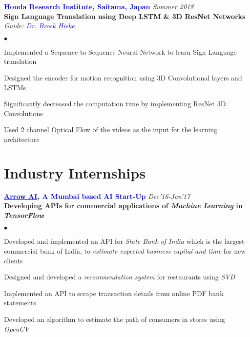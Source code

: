 \documentclass[margin,line, 9pt]{res}
\newenvironment{list2}{
  \begin{list}{$\bullet$}{%
      \setlength{\itemsep}{0.03in}
      \setlength{\parsep}{0in} \setlength{\parskip}{0in}
      \setlength{\topsep}{0in} \setlength{\partopsep}{0in} 
      \setlength{\leftmargin}{0.2in}}}{\end{list}}
\begin{document}
\begin{resume}
{\bf  \href{http://www.jp.honda-ri.com/en/}{\textcolor{blue}{Honda Research Institute, Saitama, Japan}} } \hfill {\it Summer 2018} \\
\textbf{Sign Language Translation using Deep LSTM \& 3D ResNet Networks} \\
{\em Guide: \href{https://www.researchgate.net/profile/Heike_Brock}{\textcolor{blue}{Dr. Brock Hieke}}}  \\
\vspace*{-.13in}
\begin{list2}
\item Implemented a Sequence to Sequence Neural Network to learn Sign Language translation 
\item Designed the encoder for motion recognition using 3D Convolutional layers and LSTMs
\item Significantly decreased the computation time by implementing ResNet 3D Convolutions
\item Used 2 channel Optical Flow of the videos as the input for the learning architecture
\end{list2}

\section{\sc Industry Internships}
{\bf \href{http://arrowai.com}{\textcolor{blue} {Arrow AI}}, {\textcolor{blue}{A Mumbai based AI Start-Up}}}  \hfill {\it Dec'16-Jan'17} \\
\textbf{Developing APIs for commercial applications of \emph{Machine Learning} in \emph{TensorFlow}}\\
\vspace*{-.13in}
\begin{list2}
\item Developed and implemented an API for \emph{State Bank of India} which is the largest commercial bank of India, to \emph{estimate expected business capital and time} for new clients
\item Designed and developed a \emph{recommendation system} for restaurants using \emph{SVD}
\item Implemented an API to scrape transaction details from online PDF bank statements
\item Developed an algorithm to estimate the path of consumers in stores using \emph{OpenCV} 
\end{list2}


\end{resume}
\end{document}

